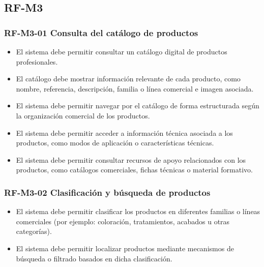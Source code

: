 \subsection{RF-M3}

\vspace{-0.75em}
\subsubsection{RF-M3-01 Consulta del catálogo de productos}
\vspace{-1em}

\begin{itemize}
    \item El sistema debe permitir consultar un catálogo digital de productos profesionales.
    \item El catálogo debe mostrar información relevante de cada producto, como nombre, referencia, descripción, familia o línea comercial e imagen asociada.
    \item El sistema debe permitir navegar por el catálogo de forma estructurada según la organización comercial de los productos.
    \item El sistema debe permitir acceder a información técnica asociada a los productos, como modos de aplicación o características técnicas.
    \item El sistema debe permitir consultar recursos de apoyo relacionados con los productos, como catálogos comerciales, fichas técnicas o material formativo.
\end{itemize}

\vspace{-0.75em}
\subsubsection{RF-M3-02 Clasificación y búsqueda de productos}
\vspace{-1em}

\begin{itemize}
    \item El sistema debe permitir clasificar los productos en diferentes familias o líneas comerciales (por ejemplo: coloración, tratamientos, acabados u otras categorías).
    \item El sistema debe permitir localizar productos mediante mecanismos de búsqueda o filtrado basados en dicha clasificación.
\end{itemize}

